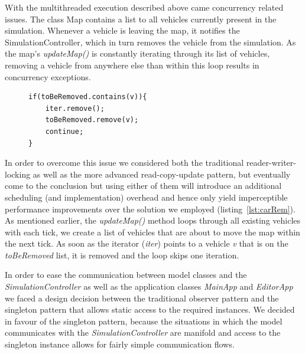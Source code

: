 With the multithreaded execution described above came concurrency related issues. The class Map contains a list to all vehicles currently present in the simulation. Whenever a vehicle is leaving the map, it notifies the SimulationController, which in turn removes the vehicle from the simulation. As the map's \textit{updateMap()} is constantly iterating through its list of vehicles, removing a vehicle from anywhere else than within this loop results in concurrency exceptions.

\begin{figure}
	\begin{minipage}{0.45\textwidth}
		\begin{lstlisting}[caption={Car Removal}, label={lst:carRem}]
if(toBeRemoved.contains(v)){
	iter.remove();
	toBeRemoved.remove(v);
	continue;
}	
		\end{lstlisting}
	\end{minipage}
\end{figure}

In order to overcome this issue we considered both the traditional reader-writer-locking as well as the more advanced read-copy-update pattern, but eventually come to the conclusion but using either of them will introduce an additional scheduling (and implementation) overhead and hence only yield imperceptible performance improvements over the solution we employed (listing~\ref{lst:carRem}). As mentioned earlier, the \textit{updateMap()} method loops through all existing vehicles with each tick, we create a list of vehicles that are about to move the map within the next tick. As soon as the iterator (\textit{iter}) points to a vehicle \textit{v} that is on the \textit{toBeRemoved} list, it is removed and the loop skips one iteration.  

In order to ease the communication between model classes and the \textit{SimulationController} as well as the application classes \textit{MainApp} and \textit{EditorApp} we faced a design decision between the traditional observer pattern and the singleton pattern that allows static access to the required instances. We decided in favour of the singleton pattern, because the situations in which the model communicates with the \textit{SimulationController} are manifold and access to the singleton instance allows for fairly simple communication flows.

